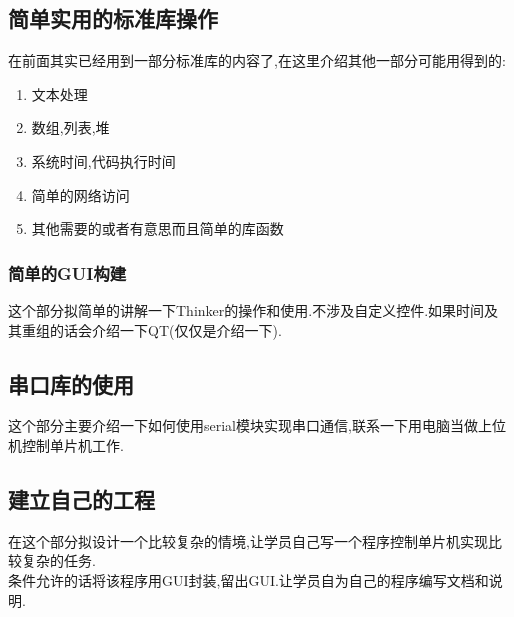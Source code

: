 \documentclass[12pt,a4paper]{article}
\begin{document}
\subsection{简单实用的标准库操作}
在前面其实已经用到一部分标准库的内容了,在这里介绍其他一部分可能用得到的:
\begin{enumerate}
\item 文本处理
\item 数组,列表,堆
\item 系统时间,代码执行时间
\item 简单的网络访问
\item 其他需要的或者有意思而且简单的库函数
\end{enumerate}

\subsubsection{简单的GUI构建}
这个部分拟简单的讲解一下Thinker的操作和使用.不涉及自定义控件.如果时间及其重组的话会介绍一下QT(仅仅是介绍一下).

\subsection{串口库的使用}
这个部分主要介绍一下如何使用serial模块实现串口通信,联系一下用电脑当做上位机控制单片机工作.
\subsection{建立自己的工程}
在这个部分拟设计一个比较复杂的情境,让学员自己写一个程序控制单片机实现比较复杂的任务.\\
条件允许的话将该程序用GUI封装,留出GUI.让学员自为自己的程序编写文档和说明.

    
\end{document}
